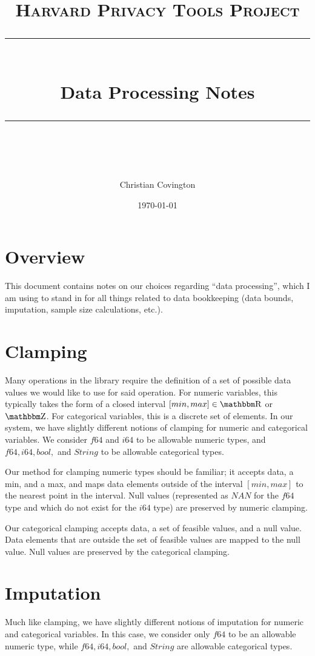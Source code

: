 \documentclass[11pt]{scrartcl} %
\title{
	\normalfont\normalsize
	\textsc{Harvard Privacy Tools Project}\\ %
	\vspace{25pt} %
	\rule{\linewidth}{0.5pt}\\ %
	\vspace{20pt} %
	{\huge Data Processing Notes}\\ %
	\vspace{12pt} %
	\rule{\linewidth}{2pt}\\ %
	\vspace{12pt} %
}
\author{\LARGE Christian Covington} %
\date{\normalsize\today} %
\begin{document}
\maketitle

\section{Overview}
This document contains notes on our choices regarding ``data processing'', which I am using to stand in
for all things related to data bookkeeping (data bounds, imputation, sample size calculations, etc.).

\section{Clamping}
Many operations in the library require the definition of a set of possible data values
we would like to use for said operation. For numeric variables, this typically
takes the form of a closed interval $[min, max] \in \R$ or $\Z$. For categorical
variables, this is a discrete set of elements.
In our system, we have slightly different notions of clamping for numeric and categorical variables.
We consider $f64$ and $i64$ to be allowable numeric types, and $f64, i64, bool,$ and $String$ to be
allowable categorical types. \newline

Our method for clamping numeric types should be familiar; it accepts data, a min, and a max,
and maps data elements outside of the interval $[min, max]$ to the nearest point in the interval.
Null values (represented as $NAN$ for the $f64$ type and which do not exist for the $i64$ type)
are preserved by numeric clamping. \newline

Our categorical clamping accepts data, a set of feasible values, and a null value.
Data elements that are outside the set of feasible values are mapped to the null value.
Null values are preserved by the categorical clamping. \newline

\section{Imputation}
Much like clamping, we have slightly different notions of imputation for numeric and categorical variables.
In this case, we consider only $f64$ to be an allowable numeric type, while
$f64, i64, bool,$ and $String$ are allowable categorical types. \newline
\end{document}
